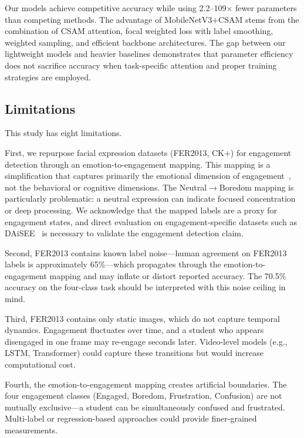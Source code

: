 \documentclass[apajournal,article,submit,pdftex,moreauthors]{Definitions/mdpi}
\begin{document}
Our models achieve competitive accuracy while using 2.2--109$\times$ fewer parameters than competing methods. The advantage of MobileNetV3+CSAM stems from the combination of CSAM attention, focal weighted loss with label smoothing, weighted sampling, and efficient backbone architectures. The gap between our lightweight models and heavier baselines demonstrates that parameter efficiency does not sacrifice accuracy when task-specific attention and proper training strategies are employed.

\subsection{Limitations}

This study has eight limitations.

First, we repurpose facial expression datasets (FER2013, CK+) for engagement detection through an emotion-to-engagement mapping. This mapping is a simplification that captures primarily the emotional dimension of engagement~\citep{fredricks2004school}, not the behavioral or cognitive dimensions. The Neutral$\rightarrow$Boredom mapping is particularly problematic: a neutral expression can indicate focused concentration or deep processing. We acknowledge that the mapped labels are a proxy for engagement states, and direct evaluation on engagement-specific datasets such as DAiSEE~\citep{solanki2022engagement} is necessary to validate the engagement detection claim.

Second, FER2013 contains known label noise---human agreement on FER2013 labels is approximately 65\%---which propagates through the emotion-to-engagement mapping and may inflate or distort reported accuracy. The 70.5\% accuracy on the four-class task should be interpreted with this noise ceiling in mind.

Third, FER2013 contains only static images, which do not capture temporal dynamics. Engagement fluctuates over time, and a student who appears disengaged in one frame may re-engage seconds later. Video-level models (e.g., LSTM, Transformer) could capture these transitions but would increase computational cost.

Fourth, the emotion-to-engagement mapping creates artificial boundaries. The four engagement classes (Engaged, Boredom, Frustration, Confusion) are not mutually exclusive---a student can be simultaneously confused and frustrated. Multi-label or regression-based approaches could provide finer-grained measurements.
\end{document}

